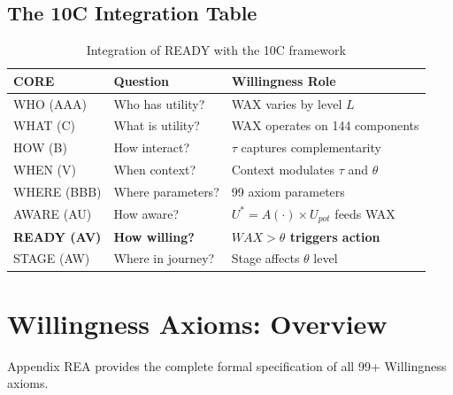 \subsection{The 10C Integration Table}

\begin{table}[h]
\centering
\begin{tabular}{lll}
\toprule
\textbf{CORE} & \textbf{Question} & \textbf{Willingness Role} \\
\midrule
WHO (AAA) & Who has utility? & WAX varies by level $L$ \\
WHAT (C) & What is utility? & WAX operates on 144 components \\
HOW (B) & How interact? & $\tau$ captures complementarity \\
WHEN (V) & When context? & Context modulates $\tau$ and $\theta$ \\
WHERE (BBB) & Where parameters? & 99 axiom parameters \\
AWARE (AU) & How aware? & $U^* = A(\cdot) \times U_{pot}$ feeds WAX \\
\textbf{READY (AV)} & \textbf{How willing?} & \textbf{$WAX > \theta$ triggers action} \\
STAGE (AW) & Where in journey? & Stage affects $\theta$ level \\
\bottomrule
\end{tabular}
\caption{Integration of READY with the 10C framework}
\label{tab:10c-ready-integration}
\end{table}



\section{Willingness Axioms: Overview}
\label{sec:12-axioms}


Appendix REA provides the complete formal specification of all 99+ Willingness axioms.

